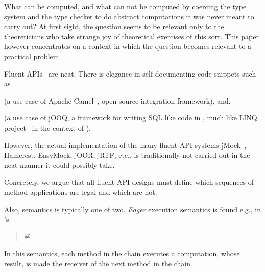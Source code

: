 What can be computed, and what can not be computed by coercing the type
system and the type checker to do abstract computations it was never meant to
carry out? At first sight, the question seems to be relevant only to the
theoreticians who take strange joy of theoretical exercises of this sort.
This paper however concentrates on a context in which the question becomes
relevant to a practical problem. 

Fluent APIs~\cite{VanDeursen:Klint:2000,Hudak:1997,Fowler:2010} are
neat. There is elegance in self-documenting code snippets such as

\begin{quote}
  \label{figure:DSL}
  \parbox[c]{44ex}{}
\end{quote}

(a use case of Apache Camel~\cite{Ibsen:Anstey:10}, open-source integration
framework), and,

\begin{quote}
\end{quote}

(a use case of jOOQ, a framework for writing
SQL like code in \Java, much like LINQ project~\cite{Meijer:Beckman:Bierman:06}
in the context of \CSharp).

However, the actual implementation of the many fluent API systems
jMock~\cite{Freeman:Pryce:06},
Hamcrest,
EasyMock,
jOOR,
jRTF,
etc., is traditionally not carried out
in the neat manner it could possibly take.

Concretely, we argue that all fluent API designs
must define which sequences of method applications are legal
and which are not.

Also, semantics is typically one of two.
\emph{Eager} execution semantics is
found e.g., in \Java's 

\begin{quote}
  \parbox[c]{50ex}{}⏎
\end{quote}

In this semantics, each method in the chain executes a computation,
  whose result, is made the receiver of the next method
  in the chain.

